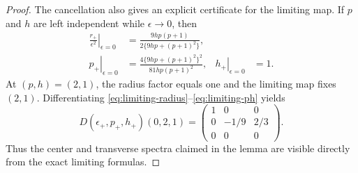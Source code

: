 \documentclass[smallextended,envcountsame]{svjour3}
\begin{document}
\begin{proof}
The cancellation also gives an explicit certificate for the limiting map.
If $p$ and $h$ are left independent while $\epsilon\to0$, then
\begin{align}
\left.\frac{r_+}{\epsilon^2}\right|_{\epsilon=0}
&=\frac{9hp(p+1)}{2\{9hp+(p+1)^2\}},
\label{eq:limiting-radius}\\
\left.p_+\right|_{\epsilon=0}
&=\frac{4\{9hp+(p+1)^2\}^2}
{81hp(p+1)^2},
&\left.h_+\right|_{\epsilon=0}&=1.
\label{eq:limiting-ph}
\end{align}
At $(p,h)=(2,1)$, the radius factor equals one and the limiting map fixes
$(2,1)$.  Differentiating \eqref{eq:limiting-radius}--\eqref{eq:limiting-ph}
yields
\begin{equation}\label{eq:limiting-jacobian}
D(\epsilon_+,p_+,h_+)(0,2,1)
=\begin{pmatrix}
1&0&0\\
0&-1/9&2/3\\
0&0&0
\end{pmatrix}.
\end{equation}
Thus the center and transverse spectra claimed in the lemma are visible
directly from the exact limiting formulas.


\end{proof}
\end{document}
